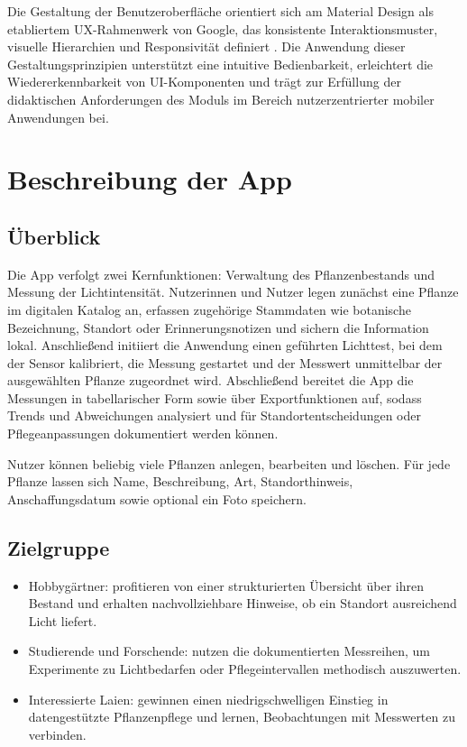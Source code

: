 \documentclass[14pt,a4paper]{report}
\begin{document}
Die Gestaltung der Benutzeroberfläche orientiert sich am Material Design als etabliertem UX-Rahmenwerk von Google, das konsistente Interaktionsmuster, visuelle Hierarchien und Responsivität definiert \cite{MaterialDesign}. Die Anwendung dieser Gestaltungsprinzipien unterstützt eine intuitive Bedienbarkeit, erleichtert die Wiedererkennbarkeit von UI-Komponenten und trägt zur Erfüllung der didaktischen Anforderungen des Moduls im Bereich nutzerzentrierter mobiler Anwendungen bei.

\chapter{Beschreibung der App}
\section{Überblick}
Die App verfolgt zwei Kernfunktionen: Verwaltung des Pflanzenbestands und Messung der Lichtintensität. Nutzerinnen und Nutzer legen zunächst eine Pflanze im digitalen Katalog an, erfassen zugehörige Stammdaten wie botanische Bezeichnung, Standort oder Erinnerungsnotizen und sichern die Information lokal. Anschließend initiiert die Anwendung einen geführten Lichttest, bei dem der Sensor kalibriert, die Messung gestartet und der Messwert unmittelbar der ausgewählten Pflanze zugeordnet wird. Abschließend bereitet die App die Messungen in tabellarischer Form sowie über Exportfunktionen auf, sodass Trends und Abweichungen analysiert und für Standortentscheidungen oder Pflegeanpassungen dokumentiert werden können.

Nutzer können beliebig viele Pflanzen anlegen, bearbeiten und löschen. Für jede Pflanze lassen sich Name, Beschreibung, Art, Standorthinweis, Anschaffungsdatum sowie optional ein Foto speichern.

\section{Zielgruppe}
\begin{itemize}
    \item Hobbygärtner: profitieren von einer strukturierten Übersicht über ihren Bestand und erhalten nachvollziehbare Hinweise, ob ein Standort ausreichend Licht liefert.
    \item Studierende und Forschende: nutzen die dokumentierten Messreihen, um Experimente zu Lichtbedarfen oder Pflegeintervallen methodisch auszuwerten.
    \item Interessierte Laien: gewinnen einen niedrigschwelligen Einstieg in datengestützte Pflanzenpflege und lernen, Beobachtungen mit Messwerten zu verbinden.
\end{itemize}
\end{document}
